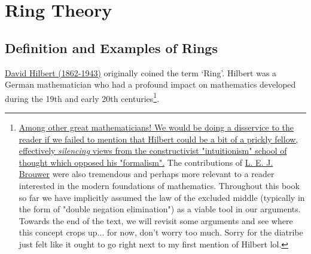 



\chapter{Ring Theory}
\vspace{-0.5in}
\section{Definition and Examples of Rings}
\href{https://en.wikipedia.org/wiki/David_Hilbert}{David Hilbert (1862-1943)} originally coined the term `Ring'. Hilbert was a German mathematician who had a profound impact on mathematics developed during the 19th and early 20th centuries\footnote{\href{https://en.wikipedia.org/wiki/Brouwer\%E2\%80\%93Hilbert_controversy}{Among other great mathematicians! We would be doing a disservice to the reader if we failed to mention that Hilbert could be a bit of a prickly fellow, effectively \textit{silencing} views from the constructivist "intuitionism" school of thought which opposed his "formalism".} The contributions of \href{https://en.wikipedia.org/wiki/L._E._J._Brouwer}{L. E. J. Brouwer} were also tremendous and perhaps more relevant to a reader interested in the modern foundations of mathematics. Throughout this book so far we have implicitly assumed the law of the excluded middle (typically in the form of "double negation elimination") as a viable tool in our arguments. Towards the end of the text, we will revisit some arguments and see where this concept crops up... for now, don't worry too much. Sorry for the diatribe just felt like it ought to go right next to my first mention of Hilbert lol.}. 

